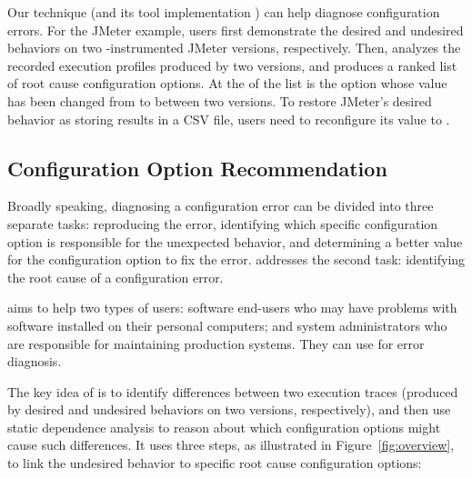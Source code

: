 
Our technique (and its tool implementation \ourtool) can help
diagnose configuration errors. For the JMeter example,
users first demonstrate the desired and undesired
behaviors on two \ourtool-instrumented
JMeter versions, respectively. Then, \ourtool analyzes the
recorded execution profiles produced by two versions, and produces
a ranked list of root cause configuration options. At the
 of the list is the
 option whose 
value has been changed from  to 
between two versions. To restore JMeter's desired
behavior as storing results in a CSV file, users
need to reconfigure its value to .

\subsection{Configuration Option Recommendation}

Broadly speaking, diagnosing a configuration
error can be divided into three separate tasks:
reproducing the error, identifying which specific
configuration option is responsible for the unexpected
behavior, and determining a better value for the
configuration option to fix the error. \ourtool addresses
the second task: identifying the root cause of
a configuration error.

\ourtool aims to help two types of users: software end-users
who may have problems with software installed on their
personal computers; and system administrators who are
responsible for maintaining production systems.
They can use \ourtool for error diagnosis.


The key idea of \ourtool is to identify differences between
two execution traces (produced by desired and
undesired behaviors on two versions, respectively),
and then use static dependence analysis to reason
about which configuration options
might cause such differences. It uses
three steps, as illustrated in Figure~\ref{fig:overview},  to link the undesired
behavior to specific root cause configuration options:

